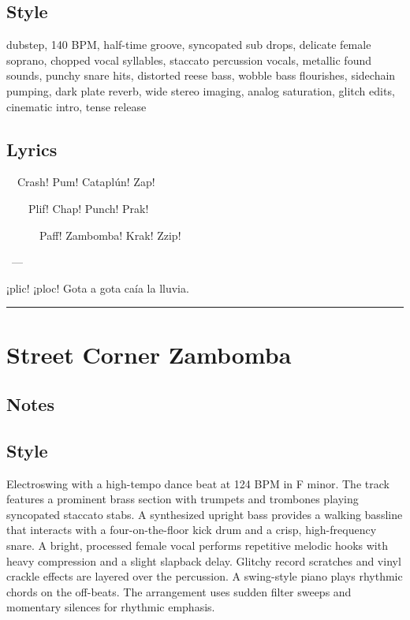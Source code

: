 \documentclass[]{article}
\begin{document}
\subsection{Style}\label{style-38}

dubstep, 140 BPM, half-time groove, syncopated sub drops, delicate
female soprano, chopped vocal syllables, staccato percussion vocals,
metallic found sounds, punchy snare hits, distorted reese bass, wobble
bass flourishes, sidechain pumping, dark plate reverb, wide stereo
imaging, analog saturation, glitch edits, cinematic intro, tense release

\subsection{Lyrics}\label{lyrics-38}

~~Crash! Pum! Cataplún! Zap!

~~~~Plif! Chap! Punch! Prak!

~~~~~~Paff! Zambomba! Krak! Zzip!

~---

¡plic! ¡ploc! Gota a gota caía la lluvia.

\begin{center}\rule{0.5\linewidth}{0.5pt}\end{center}

\section{Street Corner Zambomba}\label{street-corner-zambomba}

\subsection{Notes}\label{notes-39}

\subsection{Style}\label{style-39}

Electroswing with a high-tempo dance beat at 124 BPM in F minor. The
track features a prominent brass section with trumpets and trombones
playing syncopated staccato stabs. A synthesized upright bass provides a
walking bassline that interacts with a four-on-the-floor kick drum and a
crisp, high-frequency snare. A bright, processed female vocal performs
repetitive melodic hooks with heavy compression and a slight slapback
delay. Glitchy record scratches and vinyl crackle effects are layered
over the percussion. A swing-style piano plays rhythmic chords on the
off-beats. The arrangement uses sudden filter sweeps and momentary
silences for rhythmic emphasis.
\end{document}
